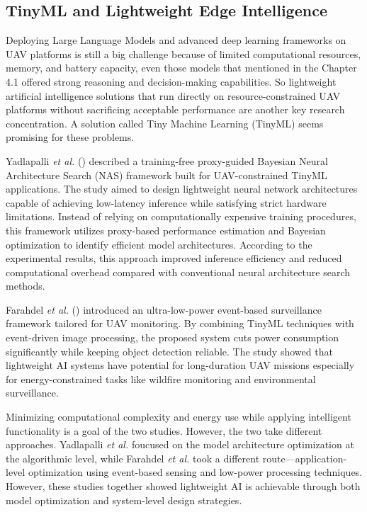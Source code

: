 \documentclass[a4paper, 12pt]{article}
\begin{document}
\subsection*{TinyML and Lightweight Edge Intelligence}
Deploying Large Language Models and advanced deep learning frameworks on UAV platforms is still a big challenge because of limited computational resources, memory, and battery capacity, even those models that mentioned in the Chapter 4.1 offered strong reasoning and decision-making capabilities. So lightweight artificial intelligence solutions that run directly on resource-constrained UAV platforms without sacrificing acceptable performance are another key research concentration. A solution called Tiny Machine Learning (TinyML) seems promising for these problems.

Yadlapalli \textit{et al.} (\cite{Yadlapalli2026}) described a training-free proxy-guided Bayesian Neural Architecture Search (NAS) framework built for UAV-constrained TinyML applications. The study aimed to design lightweight neural network architectures capable of achieving low-latency inference while satisfying strict hardware limitations. Instead of relying on computationally expensive training procedures, this framework utilizes proxy-based performance estimation and Bayesian optimization to identify efficient model architectures. According to the experimental results, this approach improved inference efficiency and reduced computational overhead compared with conventional neural architecture search methods.

Farahdel \textit{et al.} (\cite{Farahdel2025}) introduced an ultra-low-power event-based surveillance framework tailored for UAV monitoring. By combining TinyML techniques with event-driven image processing, the proposed system cuts power consumption significantly while keeping object detection reliable. The study showed that lightweight AI systems have potential for long-duration UAV missions especially for energy-constrained tasks like wildfire monitoring and environmental surveillance.

Minimizing computational complexity and energy use while applying intelligent functionality is a goal of the two studies. However, the two take different approaches. Yadlapalli \textit{et al.} foucused on the model architecture optimization at the algorithmic level, while Farahdel \textit{et al.} took a different route—application-level optimization using event-based sensing and low-power processing techniques. However, these studies together showed lightweight AI is achievable through both model optimization and system-level design strategies.
\end{document}
